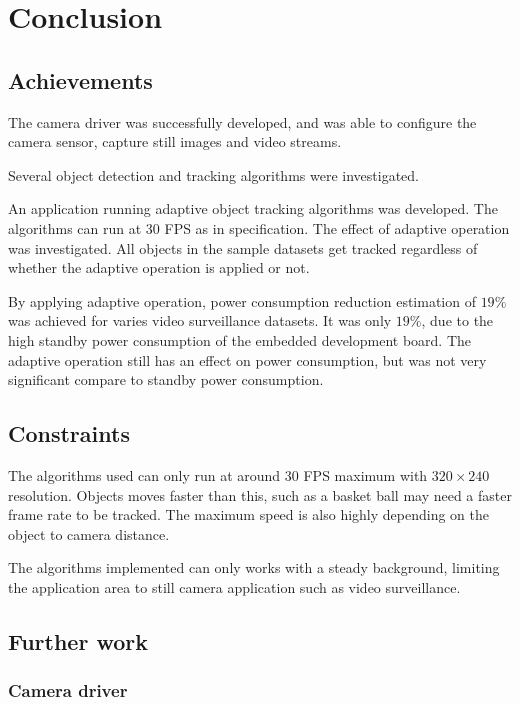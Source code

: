 \chapter{Conclusion} \label{Chapter:Conclusion}

\section{Achievements}

The camera driver was successfully developed, and was able to configure the camera sensor, capture still images and video streams.

Several object detection and tracking algorithms were investigated.

An application running adaptive object tracking algorithms was developed. The algorithms can run at 30 FPS as in specification. The effect of adaptive operation was investigated. All objects in the sample datasets get tracked regardless of whether the adaptive operation is applied or not.

By applying adaptive operation, power consumption reduction estimation of $19 \%$ was achieved for varies video surveillance datasets. It was only $19 \%$, due to the high standby power consumption of the embedded development board. The adaptive operation still has an effect on power consumption, but was not very significant compare to standby power consumption.


\section{Constraints}

The algorithms used can only run at around 30 FPS maximum with $320 \times 240$ resolution. Objects moves faster than this, such as a basket ball may need a faster frame rate to be tracked. The maximum speed is also highly depending on the object to camera distance.

The algorithms implemented can only works with a steady background, limiting the application area to still camera application such as video surveillance.

\section{Further work}

\subsection{Camera driver}

